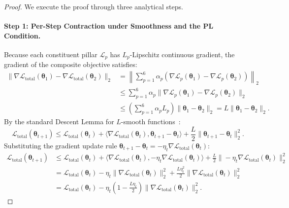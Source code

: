 \begin{proof}
We execute the proof through three analytical steps.

\paragraph{Step 1: Per-Step Contraction under Smoothness and the PL Condition.}
Because each constituent pillar $\mathcal{L}_p$ has $L_p$-Lipschitz continuous gradient, the gradient of the composite objective satisfies:
\begin{align}
\|\nabla \mathcal{L}_{\text{total}}(\bm{\theta}_1) - \nabla \mathcal{L}_{\text{total}}(\bm{\theta}_2)\|_2 &= \left\| \sum_{p=1}^6 \alpha_p (\nabla \mathcal{L}_p(\bm{\theta}_1) - \nabla \mathcal{L}_p(\bm{\theta}_2)) \right\|_2 \nonumber \\
&\le \sum_{p=1}^6 \alpha_p \|\nabla \mathcal{L}_p(\bm{\theta}_1) - \nabla \mathcal{L}_p(\bm{\theta}_2)\|_2 \nonumber \\
&\le \left( \sum_{p=1}^6 \alpha_p L_p \right) \|\bm{\theta}_1 - \bm{\theta}_2\|_2 = L \|\bm{\theta}_1 - \bm{\theta}_2\|_2.
\end{align}
By the standard Descent Lemma for $L$-smooth functions~\cite{nesterov2018lectures}:
\begin{equation}
\mathcal{L}_{\text{total}}(\bm{\theta}_{t+1}) \le \mathcal{L}_{\text{total}}(\bm{\theta}_t) + \langle \nabla \mathcal{L}_{\text{total}}(\bm{\theta}_t), \bm{\theta}_{t+1} - \bm{\theta}_t \rangle + \frac{L}{2} \|\bm{\theta}_{t+1} - \bm{\theta}_t\|_2^2.
\label{eq:descent_lemma_canonical}
\end{equation}
Substituting the gradient update rule $\bm{\theta}_{t+1} - \bm{\theta}_t = -\eta_t \nabla \mathcal{L}_{\text{total}}(\bm{\theta}_t)$:
\begin{align}
\mathcal{L}_{\text{total}}(\bm{\theta}_{t+1}) &\le \mathcal{L}_{\text{total}}(\bm{\theta}_t) + \langle \nabla \mathcal{L}_{\text{total}}(\bm{\theta}_t), -\eta_t \nabla \mathcal{L}_{\text{total}}(\bm{\theta}_t) \rangle + \frac{L}{2} \|-\eta_t \nabla \mathcal{L}_{\text{total}}(\bm{\theta}_t)\|_2^2 \nonumber \\
&= \mathcal{L}_{\text{total}}(\bm{\theta}_t) - \eta_t \|\nabla \mathcal{L}_{\text{total}}(\bm{\theta}_t)\|_2^2 + \frac{L \eta_t^2}{2} \|\nabla \mathcal{L}_{\text{total}}(\bm{\theta}_t)\|_2^2 \nonumber \\
&= \mathcal{L}_{\text{total}}(\bm{\theta}_t) - \eta_t \left( 1 - \frac{L \eta_t}{2} \right) \|\nabla \mathcal{L}_{\text{total}}(\bm{\theta}_t)\|_2^2.

\end{align}
\end{proof}
